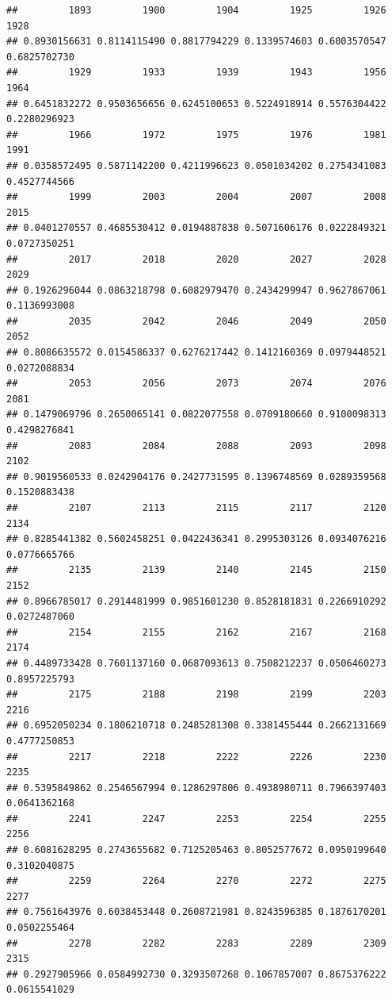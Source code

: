 \documentclass[
]{article}
\begin{document}
\begin{verbatim}
##         1893         1900         1904         1925         1926         1928 
## 0.8930156631 0.8114115490 0.8817794229 0.1339574603 0.6003570547 0.6825702730 
##         1929         1933         1939         1943         1956         1964 
## 0.6451832272 0.9503656656 0.6245100653 0.5224918914 0.5576304422 0.2280296923 
##         1966         1972         1975         1976         1981         1991 
## 0.0358572495 0.5871142200 0.4211996623 0.0501034202 0.2754341083 0.4527744566 
##         1999         2003         2004         2007         2008         2015 
## 0.0401270557 0.4685530412 0.0194887838 0.5071606176 0.0222849321 0.0727350251 
##         2017         2018         2020         2027         2028         2029 
## 0.1926296044 0.0863218798 0.6082979470 0.2434299947 0.9627867061 0.1136993008 
##         2035         2042         2046         2049         2050         2052 
## 0.8086635572 0.0154586337 0.6276217442 0.1412160369 0.0979448521 0.0272088834 
##         2053         2056         2073         2074         2076         2081 
## 0.1479069796 0.2650065141 0.0822077558 0.0709180660 0.9100098313 0.4298276841 
##         2083         2084         2088         2093         2098         2102 
## 0.9019560533 0.0242904176 0.2427731595 0.1396748569 0.0289359568 0.1520883438 
##         2107         2113         2115         2117         2120         2134 
## 0.8285441382 0.5602458251 0.0422436341 0.2995303126 0.0934076216 0.0776665766 
##         2135         2139         2140         2145         2150         2152 
## 0.8966785017 0.2914481999 0.9851601230 0.8528181831 0.2266910292 0.0272487060 
##         2154         2155         2162         2167         2168         2174 
## 0.4489733428 0.7601137160 0.0687093613 0.7508212237 0.0506460273 0.8957225793 
##         2175         2188         2198         2199         2203         2216 
## 0.6952050234 0.1806210718 0.2485281308 0.3381455444 0.2662131669 0.4777250853 
##         2217         2218         2222         2226         2230         2235 
## 0.5395849862 0.2546567994 0.1286297806 0.4938980711 0.7966397403 0.0641362168 
##         2241         2247         2253         2254         2255         2256 
## 0.6081628295 0.2743655682 0.7125205463 0.8052577672 0.0950199640 0.3102040875 
##         2259         2264         2270         2272         2275         2277 
## 0.7561643976 0.6038453448 0.2608721981 0.8243596385 0.1876170201 0.0502255464 
##         2278         2282         2283         2289         2309         2315 
## 0.2927905966 0.0584992730 0.3293507268 0.1067857007 0.8675376222 0.0615541029 

\end{verbatim}
\end{document}
